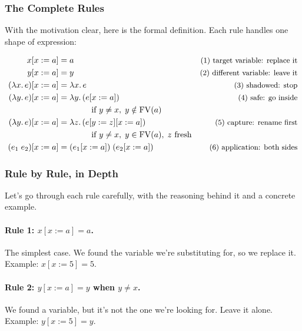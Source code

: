 \documentclass[11pt,a4paper]{article}
\theoremstyle{definition}
\newcommand{\lam}{\lambda}
\newcommand{\FV}{\operatorname{FV}}
\begin{document}
\subsubsection{The Complete Rules}

With the motivation clear, here is the formal definition. Each rule handles one
shape of expression:

\begin{defnbox}
\vspace{-0.8em}
\begin{align*}
x[x := a]              &= a
  & \text{\small(1) target variable: replace it} \\
y[x := a]              &= y
  & \text{\small(2) different variable: leave it} \\
(\lam x.\, e)[x := a]  &= \lam x.\, e
  & \text{\small(3) shadowed: stop} \\
(\lam y.\, e)[x := a]  &= \lam y.\, (e[x := a])
  & \text{\small(4) safe: go inside} \\
  &\qquad\qquad \text{if } y \neq x,\; y \notin \FV(a) & \\
(\lam y.\, e)[x := a]  &= \lam z.\, (e[y := z][x := a])
  & \text{\small(5) capture: rename first} \\
  &\qquad\qquad \text{if } y \neq x,\; y \in \FV(a),\; z \text{ fresh} & \\
(e_1\; e_2)[x := a]    &= (e_1[x := a])\;(e_2[x := a])
  & \text{\small(6) application: both sides}
\end{align*}
\end{defnbox}

\subsubsection{Rule by Rule, in Depth}

Let's go through each rule carefully, with the reasoning behind it and a
concrete example.

\paragraph{Rule 1: $x[x := a] = a$.}
The simplest case. We found the variable we're substituting for, so we replace
it. Example: $x[x := 5] = 5$.

\paragraph{Rule 2: $y[x := a] = y$ when $y \neq x$.}
We found a variable, but it's not the one we're looking for. Leave it alone.
Example: $y[x := 5] = y$.
\end{document}
